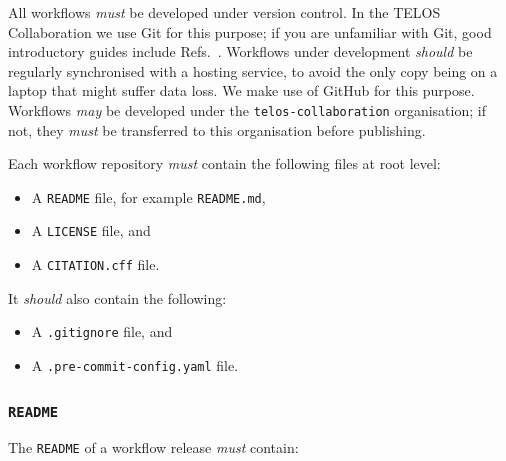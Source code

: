 \documentclass{article}
\newcommand\rfcword[1]{\emph{#1}\xspace}
\newcommand\must{\rfcword{must}}
\newcommand\should{\rfcword{should}}
\newcommand\may{\rfcword{may}}
\newcommand\filename[1]{\texttt{#1}\xspace}
\newcommand\readme{\filename{README}}
\begin{document}
All workflows \must be developed under version control.
In the TELOS Collaboration we use Git for this purpose;
if you are unfamiliar with Git,
good introductory guides include Refs.~\cite{swc-git,chacon2014pro}.
Workflows under development \should be regularly synchronised with a hosting service,
to avoid the only copy being on a laptop that might suffer data loss.
We make use of GitHub for this purpose.
Workflows \may be developed under the \texttt{telos-collaboration} organisation;
if not,
they \must be transferred to this organisation before publishing.

Each workflow repository \must contain the following files at root level:

\begin{itemize}
  \item A \readme file, for example \filename{README.md},
  \item A \filename{LICENSE} file, and
  \item A \filename{CITATION.cff} file.
\end{itemize}

It \should also contain the following:

\begin{itemize}
  \item A \filename{.gitignore} file, and
  \item A \filename{.pre-commit-config.yaml} file.
\end{itemize}

\subsubsection{\readme}

The \readme of a workflow release \must contain:
\end{document}
